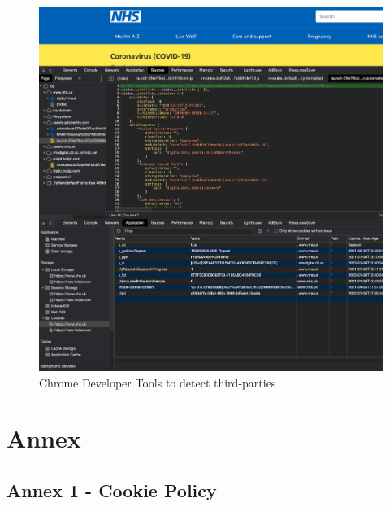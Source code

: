 \documentclass[twocolumn, letterpaper,13pt]{scrartcl}
\begin{document}
	\begin{figure}	\includegraphics[width=0.98\linewidth]{devtools.png}
    \caption{Chrome Developer Tools to detect third-parties\label{fig:e}}
    \end{figure}
	
	\section*{Annex}

	\subsection*{Annex 1 - Cookie Policy}
	
\end{document}
